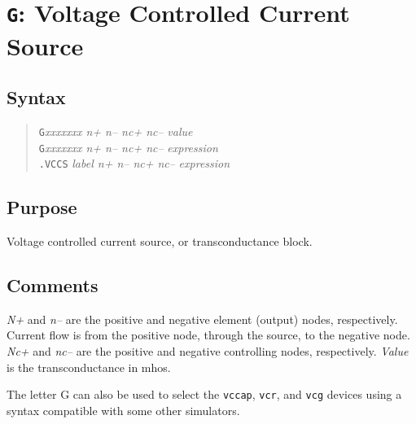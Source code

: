 %
%
%
%
\section{{\tt G}: Voltage Controlled Current Source}
\subsection{Syntax}
\begin{verse}
{\tt G}{\it xxxxxxx n+ n-- nc+ nc--} {\it value}\\
{\tt G}{\it xxxxxxx n+ n-- nc+ nc--} {\it expression}\\
{\tt .VCCS} {\it label n+ n-- nc+ nc--} {\it expression}
\end{verse}
\subsection{Purpose}

Voltage controlled current source, or transconductance block.
\subsection{Comments}

{\it N+} and {\it n--} are the positive and negative element (output)
nodes, respectively.  Current flow is from the positive node, through
the source, to the negative node.  {\it Nc+} and {\it nc--} are the
positive and negative controlling nodes, respectively.  {\it Value} is
the transconductance in mhos.

The letter G can also be used to select the {\tt vccap}, {\tt vcr},
and {\tt vcg} devices using a syntax compatible with some other
simulators.
